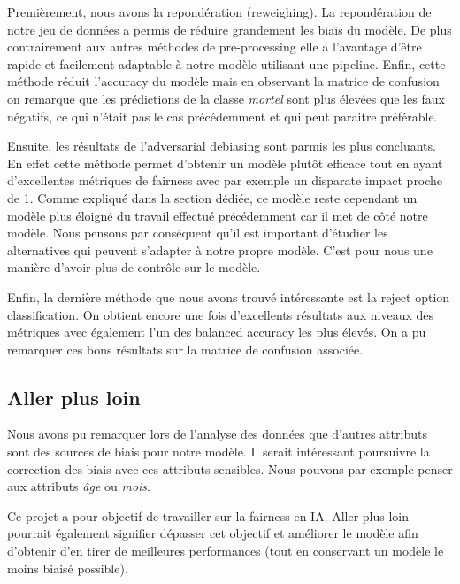 \documentclass{article}
\begin{document}
    Premièrement, nous avons la repondération (reweighing). La repondération de notre jeu de données a 
    permis de réduire grandement les biais du modèle. De plus contrairement aux autres méthodes de 
    pre-processing elle a l'avantage d'être rapide et facilement adaptable à notre modèle utilisant une 
    pipeline. Enfin, cette méthode réduit l'accuracy du modèle mais en observant la matrice de confusion 
    on remarque que les prédictions de la classe \textit{mortel} sont plus élevées que les faux négatifs, 
    ce qui n'était pas le cas précédemment et qui peut paraitre préférable.

    Ensuite, les résultats de l'adversarial debiasing sont parmis les plus concluants. En effet cette 
    méthode permet d'obtenir un modèle plutôt efficace tout en ayant d'excellentes métriques de fairness avec 
    par exemple un disparate impact proche de 1. Comme expliqué dans la section dédiée, ce modèle reste cependant 
    un modèle plus éloigné du travail effectué précédemment car il met de côté notre modèle. Nous pensons par
     conséquent qu'il est important d'étudier les alternatives qui peuvent s'adapter à notre propre modèle.
    C'est pour nous une manière d'avoir plus de contrôle sur le modèle.

    Enfin, la dernière méthode que nous avons trouvé intéressante est la reject option classification. On 
    obtient encore une fois d'excellents résultats aux niveaux des métriques avec également l'un des balanced 
    accuracy les plus élevés. On a pu remarquer ces bons résultats sur la matrice de confusion associée.

    \subsection{Aller plus loin}
    Nous avons pu remarquer lors de l'analyse des données que d'autres attributs sont des sources de biais pour 
    notre modèle. Il serait intéressant poursuivre la correction des biais avec ces attributs 
    sensibles. Nous pouvons par exemple penser aux attributs \textit{âge} ou \textit{mois}. 
    
    Ce projet a pour objectif de travailler sur la fairness en IA. Aller plus loin pourrait également 
    signifier dépasser cet objectif et améliorer le modèle afin d'obtenir d'en tirer de meilleures 
    performances (tout en conservant un modèle le moins biaisé possible).
\end{document}
